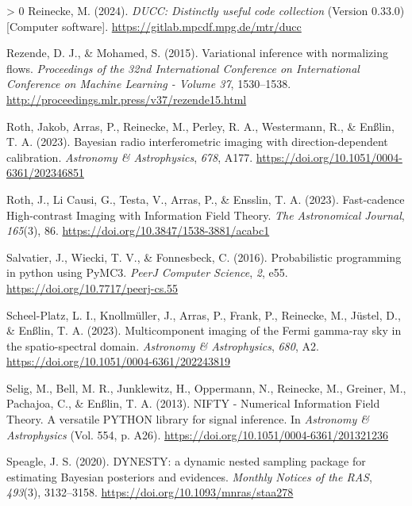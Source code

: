 \documentclass[10pt,a4paper,onecolumn]{article}
\newlength{\cslhangindent}
\newenvironment{CSLReferences}[3] %
 {%
  \setlength{\parindent}{0pt}
  \ifodd #1 \everypar{\setlength{\hangindent}{\cslhangindent}}\ignorespaces\fi
  \ifnum #2 > 0
  \setlength{\parskip}{#2\baselineskip}
  \fi
 }%
 {}
\begin{document}
\begin{CSLReferences}{1}{0}
\leavevmode\hypertarget{ref-ducc0}{}%
Reinecke, M. (2024). \emph{{DUCC}: Distinctly useful code collection}
(Version 0.33.0) {[}Computer software{]}.
\url{https://gitlab.mpcdf.mpg.de/mtr/ducc}

\leavevmode\hypertarget{ref-Rezende2015}{}%
Rezende, D. J., \& Mohamed, S. (2015). Variational inference with
normalizing flows. \emph{Proceedings of the 32nd International
Conference on International Conference on Machine Learning - Volume 37},
1530--1538. \url{http://proceedings.mlr.press/v37/rezende15.html}

\leavevmode\hypertarget{ref-Roth2023DirectionDependentCalibration}{}%
Roth, Jakob, Arras, P., Reinecke, M., Perley, R. A., Westermann, R., \&
Enßlin, T. A. (2023). {Bayesian radio interferometric imaging with
direction-dependent calibration}. \emph{Astronomy \& Astrophysics},
\emph{678}, A177. \url{https://doi.org/10.1051/0004-6361/202346851}

\leavevmode\hypertarget{ref-Roth2023FastCadenceHighContrastImaging}{}%
Roth, J., Li Causi, G., Testa, V., Arras, P., \& Ensslin, T. A. (2023).
{Fast-cadence High-contrast Imaging with Information Field Theory}.
\emph{The Astronomical Journal}, \emph{165}(3), 86.
\url{https://doi.org/10.3847/1538-3881/acabc1}

\leavevmode\hypertarget{ref-Salvatier2016}{}%
Salvatier, J., Wiecki, T. V., \& Fonnesbeck, C. (2016). Probabilistic
programming in python using PyMC3. \emph{PeerJ Computer Science},
\emph{2}, e55. \url{https://doi.org/10.7717/peerj-cs.55}

\leavevmode\hypertarget{ref-ScheelPlatz2023}{}%
Scheel-Platz, L. I., Knollmüller, J., Arras, P., Frank, P., Reinecke,
M., Jüstel, D., \& Enßlin, T. A. (2023). {Multicomponent imaging of the
Fermi gamma-ray sky in the spatio-spectral domain}. \emph{Astronomy \&
Astrophysics}, \emph{680}, A2.
\url{https://doi.org/10.1051/0004-6361/202243819}

\leavevmode\hypertarget{ref-Selig2013}{}%
Selig, M., Bell, M. R., Junklewitz, H., Oppermann, N., Reinecke, M.,
Greiner, M., Pachajoa, C., \& Enßlin, T. A. (2013). {NIFTY - Numerical
Information Field Theory. A versatile PYTHON library for signal
inference}. In \emph{Astronomy \& Astrophysics} (Vol. 554, p. A26).
\url{https://doi.org/10.1051/0004-6361/201321236}

\leavevmode\hypertarget{ref-Speagle2020}{}%
Speagle, J. S. (2020). {DYNESTY: a dynamic nested sampling package for
estimating Bayesian posteriors and evidences}. \emph{Monthly Notices of
the RAS}, \emph{493}(3), 3132--3158.
\url{https://doi.org/10.1093/mnras/staa278}


\end{CSLReferences}
\end{document}
